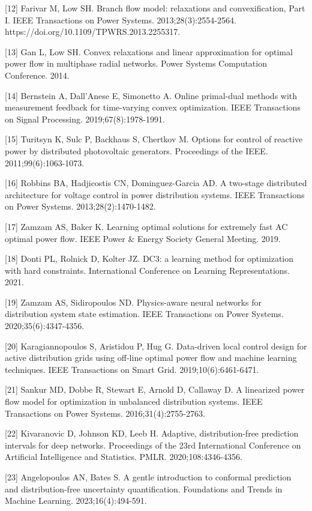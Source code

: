 \documentclass[
  preprint,12pt]{elsarticle}
\begin{document}
{[}12{]} Farivar M, Low SH. Branch flow model: relaxations and
convexification, Part I. IEEE Transactions on Power Systems.
2013;28(3):2554-2564. https://doi.org/10.1109/TPWRS.2013.2255317.

{[}13{]} Gan L, Low SH. Convex relaxations and linear approximation for
optimal power flow in multiphase radial networks. Power Systems
Computation Conference. 2014.

{[}14{]} Bernstein A, Dall'Anese E, Simonetto A. Online primal-dual
methods with measurement feedback for time-varying convex optimization.
IEEE Transactions on Signal Processing. 2019;67(8):1978-1991.

{[}15{]} Turitsyn K, Sulc P, Backhaus S, Chertkov M. Options for control
of reactive power by distributed photovoltaic generators. Proceedings of
the IEEE. 2011;99(6):1063-1073.

{[}16{]} Robbins BA, Hadjicostis CN, Dominguez-Garcia AD. A two-stage
distributed architecture for voltage control in power distribution
systems. IEEE Transactions on Power Systems. 2013;28(2):1470-1482.

{[}17{]} Zamzam AS, Baker K. Learning optimal solutions for extremely
fast AC optimal power flow. IEEE Power \& Energy Society General
Meeting. 2019.

{[}18{]} Donti PL, Rolnick D, Kolter JZ. DC3: a learning method for
optimization with hard constraints. International Conference on Learning
Representations. 2021.

{[}19{]} Zamzam AS, Sidiropoulos ND. Physics-aware neural networks for
distribution system state estimation. IEEE Transactions on Power
Systems. 2020;35(6):4347-4356.

{[}20{]} Karagiannopoulos S, Aristidou P, Hug G. Data-driven local
control design for active distribution grids using off-line optimal
power flow and machine learning techniques. IEEE Transactions on Smart
Grid. 2019;10(6):6461-6471.

{[}21{]} Sankur MD, Dobbe R, Stewart E, Arnold D, Callaway D. A
linearized power flow model for optimization in unbalanced distribution
systems. IEEE Transactions on Power Systems. 2016;31(4):2755-2763.

{[}22{]} Kivaranovic D, Johnson KD, Leeb H. Adaptive, distribution-free
prediction intervals for deep networks. Proceedings of the 23rd
International Conference on Artificial Intelligence and Statistics.
PMLR. 2020;108:4346-4356.

{[}23{]} Angelopoulos AN, Bates S. A gentle introduction to conformal
prediction and distribution-free uncertainty quantification. Foundations
and Trends in Machine Learning. 2023;16(4):494-591.
\end{document}
